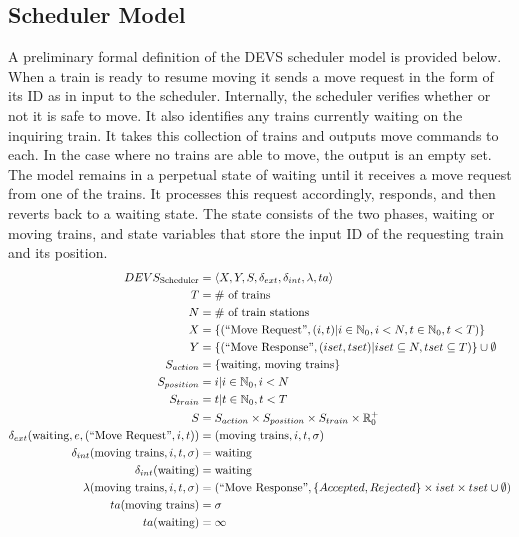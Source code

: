 \subsection{Scheduler Model}
A preliminary formal definition of the DEVS scheduler model is provided below. When a train is ready to resume moving it sends a move request in the form of its ID as in input to the scheduler.  Internally, the scheduler verifies whether or not it is safe to move.  It also identifies any trains currently waiting on the inquiring train.  It takes this collection of trains and outputs move commands to each.  In the case where no trains are able to move, the output is an empty set. The model remains in a perpetual state of waiting until it receives a move request from one of the trains.  It processes this request accordingly, responds, and then reverts back to a waiting state. The state consists of the two phases, waiting or moving trains, and state variables that store the input ID of the requesting train and its position.
\begin{align*} DEVS_{\textrm{Scheduler}} &= \left<X,Y,S,\delta_{ext},\delta_{int},\lambda,ta\right> \\
T &= \# \text{ of trains} \\
N &= \# \text{ of train stations} \\
X &= \lbrace(\text{``Move Request''}, (i,t)|i\in\mathbb{N}_0,i<N, t\in\mathbb{N}_0,t<T)\rbrace \\
Y &= \lbrace(\text{``Move Response''}, (iset,tset)|iset\subseteq N, tset\subseteq T)\rbrace \cup\emptyset \\
S_{action} &= \lbrace \text{waiting, moving trains}\rbrace \\
S_{position} &= {i|i\in\mathbb{N}_0, i<N} \\
S_{train} &= {t|t\in\mathbb{N}_0, t<T} \\
S &= S_{action}\times S_{position}\times S_{train}\times\mathbb{R}_0^+ \\
\delta_{ext}(\text{waiting},e,(\text{``Move Request''},i,t)) &= (\text{moving trains},i,t,\sigma) \\
\delta_{int}(\text{moving trains},i,t,\sigma) &= \text{waiting} \\
\delta_{int}(\text{waiting}) &= \text{waiting} \\
\lambda(\text{moving trains},i,t,\sigma) &= (\text{``Move Response''},\lbrace Accepted, Rejected\rbrace\times iset\times tset\cup \emptyset)\\
ta(\text{moving trains}) &= \sigma \\ 
ta(\text{waiting}) &= \infty \\
\end{align*}

